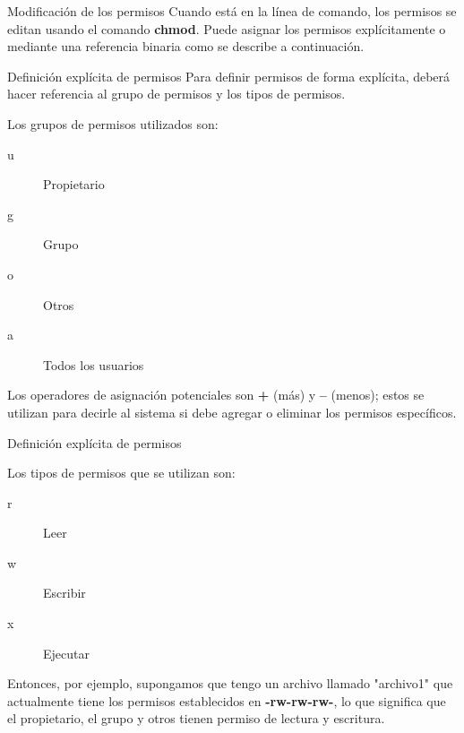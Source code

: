 \begin{frame}[c]{Modificación de los permisos}
  Cuando está en la línea de comando, los permisos se editan usando el
  comando \textbf{chmod}. Puede asignar los permisos explícitamente o
  mediante una referencia binaria como se describe a continuación.
\end{frame}

\begin{frame}[c]{Definición explícita de permisos}
  Para definir permisos de forma explícita, deberá hacer referencia al
  grupo de permisos y los tipos de permisos.

  \vspace{\baselineskip}
  Los grupos de permisos utilizados son:
  \begin{description}
    \item [u] Propietario
    \item [g] Grupo
    \item [o] Otros
    \item [a] Todos los usuarios
  \end{description}

  \vspace{\baselineskip}
  Los operadores de asignación potenciales son \textbf{+} (más) y \textbf{–}
  (menos); estos se utilizan para decirle al sistema si debe agregar o
  eliminar los permisos específicos.
\end{frame}

\begin{frame}[c]{Definición explícita de permisos}

  Los tipos de permisos que se utilizan son:

  \begin{description}
    \item [r] Leer
    \item [w] Escribir
    \item [x] Ejecutar
  \end{description}

  \vspace{\baselineskip}
  Entonces, por ejemplo, supongamos que tengo un archivo llamado "archivo1"
  que actualmente tiene los permisos establecidos en \textbf{-rw-rw-rw-},
  lo que significa que el propietario, el grupo y otros tienen
  permiso de lectura y escritura.
\end{frame}

